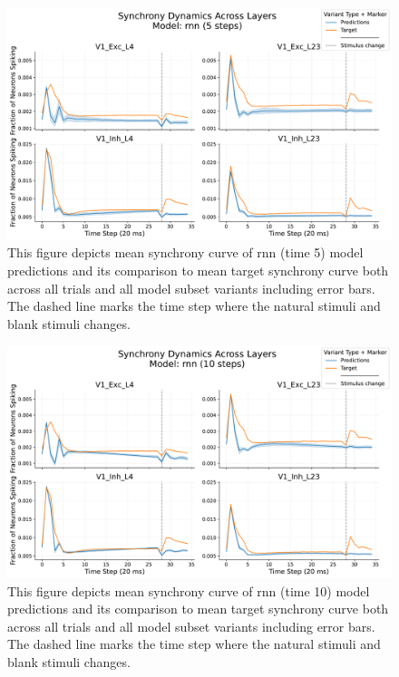 \begin{figure}
    \centering
    \includegraphics[width=\linewidth]{img/plots/separate_model_synchrony_curve_rnn_separate_5_evaluation.pdf}
    \caption{This figure depicts mean synchrony curve of rnn (time 5) model predictions and its comparison to mean target synchrony curve both across all trials and all model subset variants including error bars. The dashed line marks the time step where the natural stimuli and blank stimuli changes.}
    \label{fig:synchrony_curve_rnn_5}
\end{figure}

\begin{figure}
    \centering
    \includegraphics[width=\linewidth]{img/plots/separate_model_synchrony_curve_rnn_separate_10_evaluation.pdf}
    \caption{This figure depicts mean synchrony curve of rnn (time 10) model predictions and its comparison to mean target synchrony curve both across all trials and all model subset variants including error bars. The dashed line marks the time step where the natural stimuli and blank stimuli changes.}
    \label{fig:synchrony_curve_rnn_10}
\end{figure}


